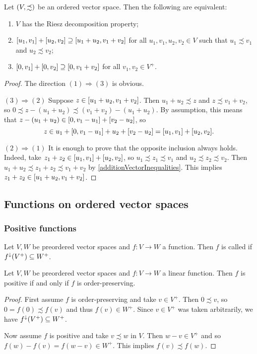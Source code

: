 \begin{lemma} \label{RieszDecompositionLemma}
Let $\sSet{V, \precsim}$ be an ordered vector space. Then the following are equivalent:
\begin{enumerate}
\item $V$ has the Riesz decomposition property;
\item $\interval{u_1,v_1} + \interval{u_2,v_2} \supseteq \interval{u_1+u_2,v_1+v_2}$ for all $u_1,v_1,u_2,v_2\in V$ such that $u_1\precsim v_1$ and $u_2\precsim v_2$;
\item $\interval{0,v_1} + \interval{0,v_2} \supseteq \interval{0,v_1+v_2}$ for all $v_1,v_2\in V^+$.
\end{enumerate}
\end{lemma}
\begin{proof}
The direction $(1) \Rightarrow (3)$ is obvious.

$(3) \Rightarrow (2)$ Suppose $z\in \interval{u_1+u_2,v_1+v_2}$. Then $u_1+u_2 \precsim z$ and $z\precsim v_1+v_2$, so $0\precsim z - (u_1+u_2) \precsim (v_1+v_2) - (u_1+u_2)$. By assumption, this means that $z - (u_1+u_2)\in \interval{0, v_1 - u_1} + \interval{v_2 - u_2}$, so
\[ z \in u_1 + \interval{0, v_1 - u_1} + u_2 + \interval{v_2 - u_2} = \interval{u_1,v_1} + \interval{u_2,v_2}. \]

$(2) \Rightarrow (1)$ It is enough to prove that the opposite inclusion always holds. Indeed, take $z_1 + z_2 \in \interval{u_1,v_1} + \interval{u_2,v_2}$, so $u_1 \precsim z_1 \precsim v_1$ and $u_2 \precsim z_2 \precsim v_2$. Then $u_1 + u_2 \precsim z_1 + z_2 \precsim v_1 + v_2$ by \ref{additionVectorInequalities}. This implies $z_1+z_2 \in \interval{u_1+u_2,v_1+v_2}$.
\end{proof}

\subsection{Functions on ordered vector spaces}
\subsubsection{Positive functions}
\begin{definition}
Let $V,W$ be preordered vector spaces and $f: V\to W$ a function. Then $f$ is called  if $f^\downarrow(V^+) \subseteq W^+$.
\end{definition}

\begin{lemma} \label{positiveLinearFunctionIsotone}
Let $V,W$ be preordered vector spaces and $f: V\to W$ a linear function. Then $f$ is positive \textup{if and only if} $f$ is order-preserving.
\end{lemma}
\begin{proof}
First assume $f$ is order-preserving and take $v\in V^+$. Then $0\precsim v$, so $0=f(0) \precsim f(v)$ and thus $f(v)\in W^+$. Since $v\in V^+$ was taken arbitrarily, we have $f^\downarrow(V^+) \subseteq W^+$.

Now assume $f$ is positive and take $v\precsim w$ in $V$. Then $w-v \in V^+$ and so $f(w) - f(v) = f(w-v) \in W^+$. This implies $f(v)\precsim f(w)$.
\end{proof}


